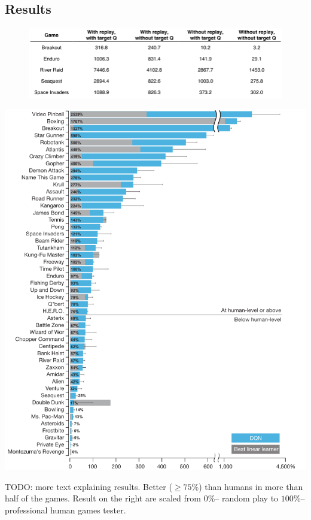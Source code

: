 \documentclass{tufte-handout}
\begin{document}
\subsection{Results}
\vspace{-10pt}
\begin{figure}[h]
  \centering
  \includegraphics[width=0.9\linewidth]{res1}
\end{figure}


\begin{marginfigure}[-2.5cm]
  \centering
  \includegraphics[width=1.2\linewidth]{res2}
\end{marginfigure}

TODO: more text explaining results. Better ($\ge 75\%$) than humans in more than half of the games. Result on the right are scaled from $0\%$-- random play to $100\%$-- professional human games tester.
\end{document}
